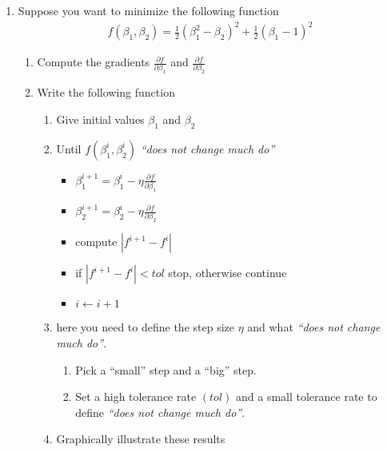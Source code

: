 \documentclass[12pt,onecolumn]{article}
\begin{document}
\begin{enumerate}
  \item  Suppose you want to minimize the following function 
  \begin{align}
  f(\beta_1,\beta_2)=\frac{1}{2}(\beta_1^2-\beta_2)^2+ \frac{1}{2}(\beta_1-1)^2
  \end{align}
  \begin{enumerate}
    \item Compute the gradients $\frac{\partial f}{\partial \beta_1}$ and $\frac{\partial f}{\partial \beta_2}$
    \item Write the following function
    \begin{enumerate}
      \item Give initial values $\beta_1$ and $\beta_2$
      \item Until $f(\beta^i_1,\beta^i_2)$ {\it ``does not change much do''}
      \begin{itemize}
       \item $\beta_1^{i+1} = \beta_1^{i} - \eta \frac{\partial f}{\partial \beta_1}$
       \item $\beta_2^{i+1} = \beta_2^{i} - \eta \frac{\partial f}{\partial \beta_2}$
       \item compute $|f^{i+1}-f^{i}|$
       \item if $|f^{i+1}-f^{i}|<tol$ stop, otherwise continue
       \item $i \leftarrow i+1$
      \end{itemize}
      \item here you need to define the step size $\eta$ and what {\it ``does not change much do''}. 
      \begin{enumerate}
        \item Pick a ``small'' step and a ``big'' step. 
        \item Set a high tolerance rate $(tol)$ and a small tolerance rate to define {\it ``does not change much do''}. 
      \end{enumerate}
      \item Graphically illustrate these results
    \end{enumerate}
  \end{enumerate}
        

\end{enumerate}
\end{document}

